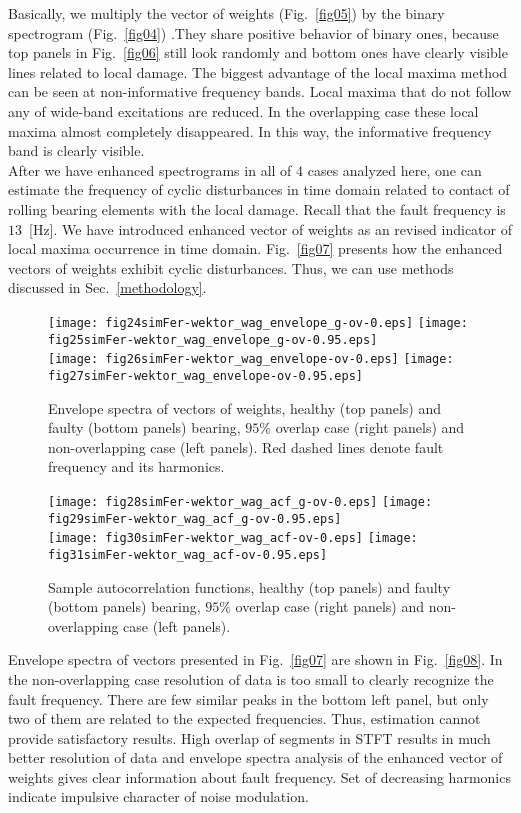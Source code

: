 \documentclass[3p,times]{elsarticle}
\begin{document}
Basically, we multiply the vector of weights (Fig.~\ref{fig05}) by the binary spectrogram (Fig.~\ref{fig04}) .They share positive behavior of binary ones, because top panels in Fig.~\ref{fig06} still look randomly and bottom ones have clearly visible lines related to local damage. The biggest advantage of the local maxima method can be seen at non-informative frequency bands. Local maxima that do not follow any of wide-band excitations are reduced. In the overlapping case these local maxima almost completely disappeared. In this way, the informative frequency band is clearly visible.\\
After we have enhanced spectrograms in all of $4$ cases analyzed here, one can estimate the frequency of cyclic disturbances in time domain related to contact of rolling bearing elements with the local damage. Recall that the fault frequency is $13$~[Hz]. We have introduced enhanced vector of weights as an revised indicator of local maxima occurrence in time domain. Fig.~\ref{fig07} presents how the enhanced vectors of weights exhibit cyclic disturbances. Thus, we can use methods discussed in Sec.~\ref{methodology}.\\
\begin{figure}[ht]
\begin{center}
\texttt{[image: fig24simFer-wektor\_wag\_envelope\_g-ov-0.eps]}
\texttt{[image: fig25simFer-wektor\_wag\_envelope\_g-ov-0.95.eps]}\\
\texttt{[image: fig26simFer-wektor\_wag\_envelope-ov-0.eps]}
\texttt{[image: fig27simFer-wektor\_wag\_envelope-ov-0.95.eps]}
\caption{Envelope spectra of vectors of weights, healthy (top panels) and faulty (bottom panels) bearing, $95\%$ overlap case (right panels) and non-overlapping case (left panels). Red dashed lines denote fault frequency and its harmonics.}\label{fig08}
\texttt{[image: fig28simFer-wektor\_wag\_acf\_g-ov-0.eps]}
\texttt{[image: fig29simFer-wektor\_wag\_acf\_g-ov-0.95.eps]}\\
\texttt{[image: fig30simFer-wektor\_wag\_acf-ov-0.eps]}
\texttt{[image: fig31simFer-wektor\_wag\_acf-ov-0.95.eps]}
\caption{Sample autocorrelation functions, healthy (top panels) and faulty (bottom panels) bearing, $95\%$ overlap case (right panels) and non-overlapping case (left panels).}\label{fig09}
\end{center}
\end{figure}
Envelope spectra of vectors presented in Fig.~\ref{fig07} are shown in Fig.~\ref{fig08}. In the non-overlapping case resolution of data is too small to clearly recognize the fault frequency. There are few similar peaks in the bottom left panel, but only two of them are related to the expected frequencies. Thus, estimation cannot provide satisfactory results. High overlap of segments in STFT results in much better resolution of data and envelope spectra analysis of the enhanced vector of weights gives clear information about fault frequency. Set of decreasing harmonics indicate impulsive character of noise modulation.\\
\end{document}
